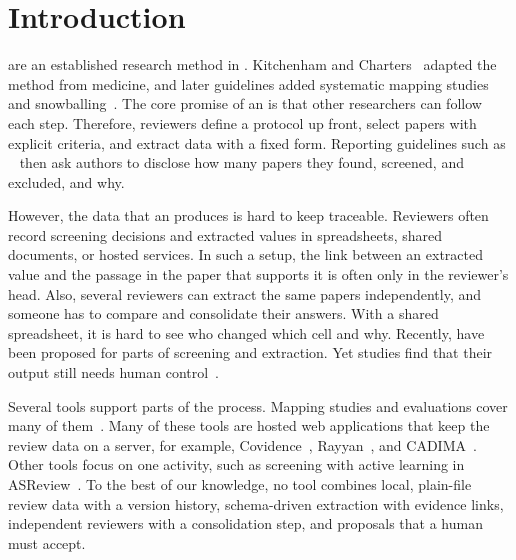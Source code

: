 \section{Introduction}\label{sec:introduction}

\SLRs are an established research method in \SE.
Kitchenham and Charters~\cite{kitchenham2007guidelines} adapted the method from medicine, and later guidelines added systematic mapping studies and snowballing~\cite{petersen2015guidelines,wohlin2014guidelines}.
The core promise of an \SLR is that other researchers can follow each step.
Therefore, reviewers define a protocol up front, select papers with explicit criteria, and extract data with a fixed form.
Reporting guidelines such as \PRISMA~\cite{page2021prisma} then ask authors to disclose how many papers they found, screened, and excluded, and why.

However, the data that an \SLR produces is hard to keep traceable.
Reviewers often record screening decisions and extracted values in spreadsheets, shared documents, or hosted services.
In such a setup, the link between an extracted value and the passage in the paper that supports it is often only in the reviewer's head.
Also, several reviewers can extract the same papers independently, and someone has to compare and consolidate their answers.
With a shared spreadsheet, it is hard to see who changed which cell and why.
Recently, \LLMs have been proposed for parts of screening and extraction.
Yet studies find that their output still needs human control~\cite{felizardo2024chatgpt,khraisha2024llm}.

Several tools support parts of the process.
Mapping studies and evaluations cover many of them~\cite{marshall2013tools,marshall2014tools,harrison2020software}.
Many of these tools are hosted web applications that keep the review data on a server, for example, Covidence~\cite{covidence}, Rayyan~\cite{ouzzani2016rayyan}, and CADIMA~\cite{kohl2018cadima}.
Other tools focus on one activity, such as screening with active learning in ASReview~\cite{vandeschoot2021asreview}.
To the best of our knowledge, no tool combines local, plain-file review data with a version history, schema-driven extraction with evidence links, independent reviewers with a consolidation step, and \LLM proposals that a human must accept.


